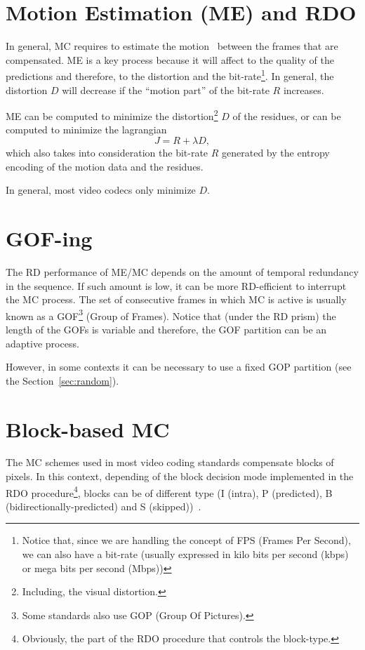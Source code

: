 
\section{Motion Estimation (ME) and RDO}

In general, MC requires to estimate the
motion~\cite{vruiz__MEC,vruiz__OFME} between the frames that are
compensated. ME is a key process because it will affect to the quality
of the predictions and therefore, to the distortion and the
bit-rate\footnote{Notice that, since we are handling the concept of
  FPS (Frames Per Second), we can also have a bit-rate (usually
  expressed in kilo bits per second (kbps) or mega bits per second
  (Mbps))}. In general, the distortion $D$ will decrease if the
``motion part'' of the bit-rate $R$ increases.

ME can be computed to minimize the distortion\footnote{Including, the
  visual distortion.} $D$ of the residues, or can be computed to
minimize the lagrangian
\begin{equation}
  J = R + \lambda D,
\end{equation}
which also takes into consideration the bit-rate $R$ generated by the
entropy encoding of the motion data and the residues.

In general, most video codecs only minimize $D$.


\section{GOF-ing}

The RD performance of ME/MC depends on the amount of temporal
redundancy in the sequence. If such amount is low, it can be more
RD-efficient to interrupt the MC process. The set of consecutive
frames in which MC is active is usually known as a GOF\footnote{Some
  standards also use GOP (Group Of Pictures).} (Group of
Frames). Notice that (under the RD prism) the length of the GOFs is
variable and therefore, the GOF partition can be an adaptive process.

However, in some contexts it can be necessary to use a fixed GOP
partition (see the Section~\ref{sec:random}).

\section{Block-based MC}

The MC schemes used in most video coding standards compensate blocks
of pixels. In this context, depending of the block decision mode
implemented in the RDO procedure\footnote{Obviously, the part of the
  RDO procedure that controls the block-type.}, blocks can be of
different type (I (intra), P (predicted), B
(bidirectionally-predicted) and S (skipped))~\cite{vruiz__MEC}.

